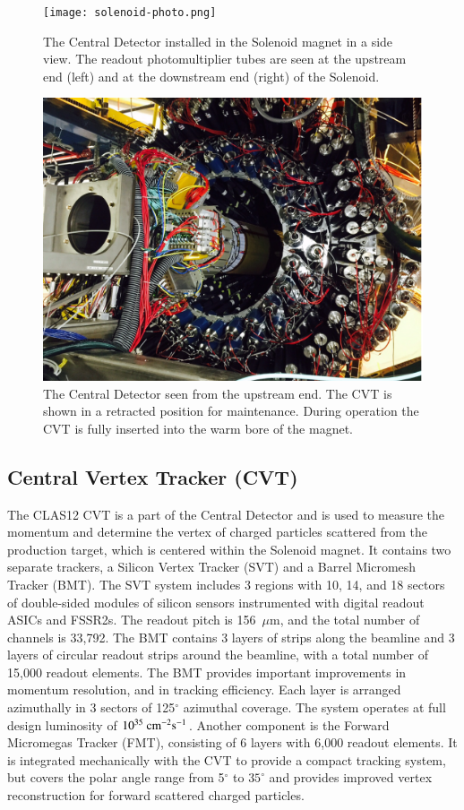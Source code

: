\documentclass[final,3p,twocolumn]{elsarticle}
\begin{document}
\begin{figure}[htbp!]
\centerline{\texttt{[image: solenoid-photo.png]}}
\caption{The Central Detector installed in the Solenoid magnet in a side view. The readout photomultiplier tubes are
seen at the upstream end (left) and at the downstream end (right) of the Solenoid.}
\label{CDinSol}
\end{figure}

\begin{figure}[htbp!]
\centerline{\includegraphics[width=1.0\columnwidth,angle=90]{CLAS12-CD.png}}
\caption{The Central Detector seen from the upstream end. The CVT is shown in a retracted position for
maintenance. During operation the CVT is fully inserted into the warm bore of the magnet.}
\label{CDback}
\end{figure}

\subsection{Central Vertex Tracker (CVT)}

The CLAS12 CVT is a part of the Central Detector and is used to measure the momentum and determine the vertex of
charged particles scattered from the production target, which is centered within the Solenoid magnet. It contains two
separate trackers, a Silicon Vertex Tracker (SVT) and a Barrel Micromesh Tracker  (BMT). The SVT system includes 3
regions with 10, 14, and 18 sectors of double-sided modules of silicon sensors instrumented with digital readout ASICs and
FSSR2s. The readout pitch is 156~$\mu$m, and the total number of channels is 33,792. The BMT contains 3 layers of
strips along the beamline and 3 layers of circular readout strips around the beamline, with a total number of 15,000 readout
elements. The BMT provides important improvements in momentum resolution, and in tracking efficiency. Each layer is
arranged azimuthally in 3 sectors of 125$^\circ$ azimuthal coverage. The system operates at full design luminosity of
$10^{35}\rm~{cm^{-2}s^{-1}}$. Another component is the Forward Micromegas Tracker (FMT), consisting of 6 layers with
6,000 readout elements. It  is integrated mechanically with the CVT to provide a compact tracking system, but covers the
polar angle range from 5$^\circ$ to $35^\circ$ and provides improved vertex reconstruction for forward scattered charged
particles.
\end{document}
